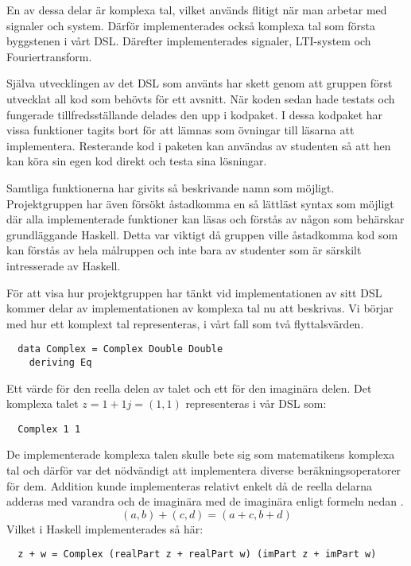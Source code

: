 \documentclass[12pt,a4paper,twoside,openright]{article}
\begin{document}
En av dessa delar är komplexa tal, vilket används flitigt när man
arbetar med signaler och system. Därför implementerades också komplexa
tal som första byggstenen i vårt DSL. Därefter implementerades
signaler, LTI-system och Fouriertransform.

Själva utvecklingen av det DSL som använts har skett genom att gruppen
först utvecklat all kod som behövts för ett avsnitt. När koden sedan
hade testats och fungerade tillfredsställande delades den upp i
kodpaket. I dessa kodpaket har vissa funktioner tagits bort för att
lämnas som övningar till läsarna att implementera. Resterande kod i
paketen kan användas av studenten så att hen kan köra sin egen kod
direkt och testa sina lösningar.

Samtliga funktionerna har givits så beskrivande namn som
möjligt. Projektgruppen har även försökt åstadkomma en så lättläst
syntax som möjligt där alla implementerade funktioner kan läsas och
förstås av någon som behärskar grundläggande Haskell. Detta var
viktigt då gruppen ville åstadkomma kod som kan förstås av hela
målruppen och inte bara av studenter som är särskilt intresserade av
Haskell.

För att visa hur projektgruppen har tänkt vid implementationen av sitt
DSL kommer delar av implementationen av komplexa tal nu att
beskrivas. Vi börjar med hur ett komplext tal representeras, i vårt
fall som två flyttalsvärden.
\begin{verbatim}
  data Complex = Complex Double Double
    deriving Eq
\end{verbatim}
Ett värde för den reella delen av talet
och ett för den imaginära delen. Det komplexa talet
\(z = 1 + 1j = (1,1) \) representeras i vår DSL som:

\begin{verbatim}
  Complex 1 1
\end{verbatim}

De implementerade komplexa talen skulle bete sig som matematikens
komplexa tal och därför var det nödvändigt att implementera diverse
beräkningsoperatorer för dem. Addition kunde implementeras relativt
enkelt då de reella delarna adderas med varandra och de imaginära med
de imaginära enligt formeln nedan \cite{conway1978functions}.
\[(a, b) + (c, d) = (a + c, b + d)\]
Vilket i Haskell implementerades så här:
\begin{verbatim}
  z + w = Complex (realPart z + realPart w) (imPart z + imPart w)
\end{verbatim}
\end{document}
